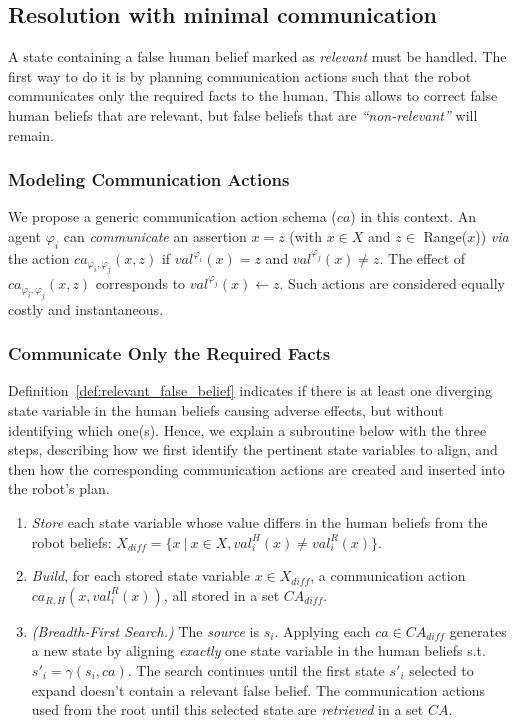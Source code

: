     \subsection{Resolution with minimal communication}

A state containing a false human belief marked as \textit{relevant} must be handled. 
The first way to do it is by planning communication actions such that the robot communicates only the required facts to the human. This allows to correct false human beliefs that are relevant, but false beliefs that are \textit{``non-relevant''} will remain. 

\subsubsection{Modeling Communication Actions} 
We propose a generic communication action schema ($ca$) in this context. 
An agent $\varphi_i$ can \textit{communicate} an assertion $x=z$ (with $x \in X$ and $z \in$ Range($x$)) \textit{via} the action $ca_{\varphi_i, \varphi_j}(x,z)$ if $val^{\varphi_i}(x) = z$ and $val^{\varphi_j}(x) \neq z$.
The effect of $ca_{\varphi_i, \varphi_j}(x,z)$ corresponds to $val^{\varphi_j}(x) \leftarrow z$. Such actions are considered equally costly and instantaneous.

\subsubsection{Communicate Only the Required Facts}
Definition~\ref{def:relevant_false_belief} indicates if there is at least one diverging state variable in the human beliefs causing adverse effects, but without identifying which one(s).
Hence, we explain a subroutine below with the three steps, describing how we first identify the pertinent state variables to align, and then how the corresponding communication actions are created and inserted into the robot's plan.

\begin{enumerate}
    \item 
    \textit{Store} each state variable whose value differs in the human beliefs from the robot beliefs: $X_{diff} = \{ x ~|~ x\in X, val^H_i(x) \neq val^R_i(x) \}$.

    \item
    \textit{Build}, for each stored state variable $x \in X_{diff}$, a communication action $ca_{R, H}(x,val^R_i(x))$, all stored in a set $\mathit{CA}_{diff}$.

    \item 
    \textit{(Breadth-First Search.)} 
    The \textit{source} is $s_i$. Applying each $ca \in \mathit{CA}_{diff}$ generates a new state by aligning \textit{exactly} one state variable in the human beliefs s.t. $s'_i = \gamma(s_i, ca )$. 
    The search continues until the first state $s'_i$ selected to expand doesn't contain a relevant false belief. The communication actions used from the root until this selected state are \textit{retrieved} in a set $\mathit{CA}$.
\end{enumerate}

